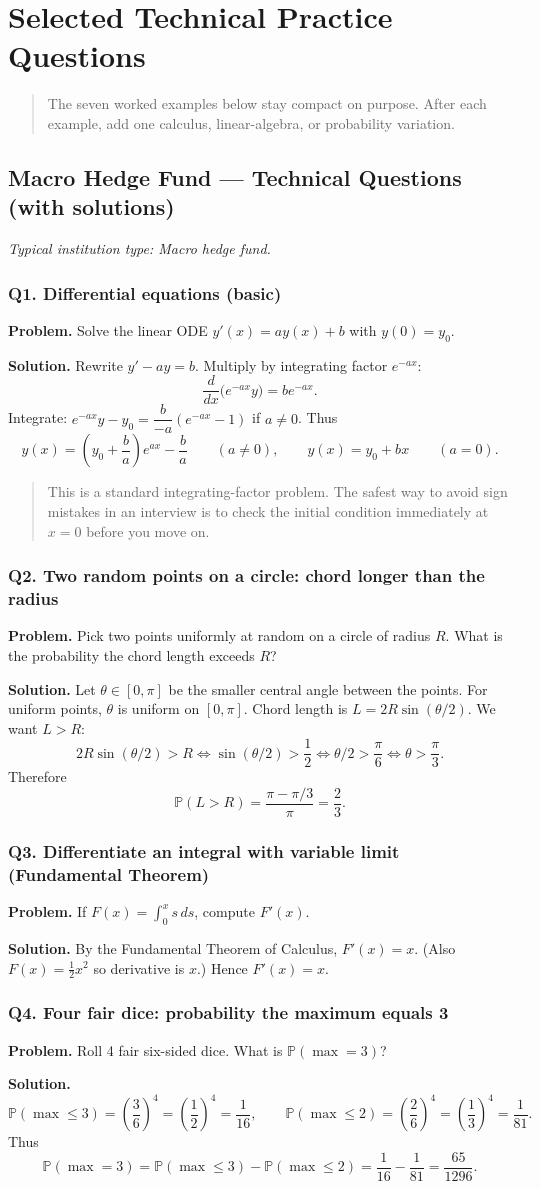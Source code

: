 \documentclass[11pt,letterpaper,openany]{book}
\newcommand{\RoleProfile}[2]{%
  \subsection{#1}%
  \noindent\textit{Typical institution type: #2.}\par
}
\newcommand{\prompt}[1]{\subsubsection*{#1}}
\newcommand{\playbooknote}[1]{\begin{quote}\small #1\end{quote}}
\begin{document}
\section{Selected Technical Practice Questions}
\playbooknote{The seven worked examples below stay compact on purpose. After each example, add one calculus, linear-algebra, or probability variation.}

\RoleProfile{Macro Hedge Fund --- Technical Questions (with solutions)}{Macro hedge fund}

\prompt{Q1. Differential equations (basic)}
\textbf{Problem.} Solve the linear ODE $y'(x) = ay(x) + b$ with $y(0) = y_0$.

\textbf{Solution.} Rewrite $y' - ay = b$. Multiply by integrating factor $e^{-ax}$:
\[
  \frac{d}{dx}\bigl(e^{-ax}y\bigr) = be^{-ax}.
\]
Integrate: $e^{-ax}y - y_0 = \dfrac{b}{-a}(e^{-ax} - 1)$ if $a \ne 0$. Thus
\[
  y(x) = \left(y_0 + \frac{b}{a}\right)e^{ax} - \frac{b}{a}
  \qquad (a \ne 0),
  \qquad
  y(x) = y_0 + bx
  \qquad (a = 0).
\]
\playbooknote{This is a standard integrating-factor problem. The safest way to avoid sign mistakes in an interview is to check the initial condition immediately at $x=0$ before you move on.}

\prompt{Q2. Two random points on a circle: chord longer than the radius}
\textbf{Problem.} Pick two points uniformly at random on a circle of radius $R$. What is the probability the chord length exceeds $R$?

\textbf{Solution.} Let $\theta \in [0,\pi]$ be the smaller central angle between the points. For uniform points, $\theta$ is uniform on $[0,\pi]$. Chord length is $L = 2R\sin(\theta/2)$. We want $L > R$:
\[
  2R\sin(\theta/2) > R
  \Longleftrightarrow
  \sin(\theta/2) > \frac12
  \Longleftrightarrow
  \theta/2 > \frac{\pi}{6}
  \Longleftrightarrow
  \theta > \frac{\pi}{3}.
\]
Therefore
\[
  \mathbb{P}(L > R) = \frac{\pi - \pi/3}{\pi} = \frac{2}{3}.
\]

\prompt{Q3. Differentiate an integral with variable limit (Fundamental Theorem)}
\textbf{Problem.} If $F(x) = \int_0^x s\,ds$, compute $F'(x)$.

\textbf{Solution.} By the Fundamental Theorem of Calculus, $F'(x) = x$. (Also $F(x) = \tfrac12 x^2$ so derivative is $x$.) Hence $F'(x) = x$.

\prompt{Q4. Four fair dice: probability the maximum equals 3}
\textbf{Problem.} Roll 4 fair six-sided dice. What is $\mathbb{P}(\max = 3)$?

\textbf{Solution.}
\[
  \mathbb{P}(\max \le 3) = \left(\frac{3}{6}\right)^4 = \left(\frac12\right)^4 = \frac1{16},
  \qquad
  \mathbb{P}(\max \le 2) = \left(\frac{2}{6}\right)^4 = \left(\frac13\right)^4 = \frac1{81}.
\]
Thus
\[
  \mathbb{P}(\max = 3) = \mathbb{P}(\max \le 3) - \mathbb{P}(\max \le 2) = \frac1{16} - \frac1{81} = \frac{65}{1296}.
\]
\end{document}
